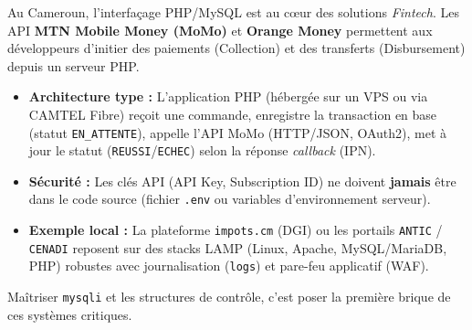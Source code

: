 \documentclass[11pt]{article}
\begin{document}
\begin{savaistu}
Au Cameroun, l'interfaçage PHP/MySQL est au cœur des solutions \emph{Fintech}. Les API \textbf{MTN Mobile Money (MoMo)} et \textbf{Orange Money} permettent aux développeurs d'initier des paiements (Collection) et des transferts (Disbursement) depuis un serveur PHP.
\begin{itemize}
\item \textbf{Architecture type :} L'application PHP (hébergée sur un VPS ou via CAMTEL Fibre) reçoit une commande, enregistre la transaction en base (statut \texttt{EN\_ATTENTE}), appelle l'API MoMo (HTTP/JSON, OAuth2), met à jour le statut (\texttt{REUSSI}/\texttt{ECHEC}) selon la réponse \emph{callback} (IPN).
\item \textbf{Sécurité :} Les clés API (API Key, Subscription ID) ne doivent \textbf{jamais} être dans le code source (fichier \texttt{.env} ou variables d'environnement serveur).
\item \textbf{Exemple local :} La plateforme \texttt{impots.cm} (DGI) ou les portails \texttt{ANTIC} / \texttt{CENADI} reposent sur des stacks LAMP (Linux, Apache, MySQL/MariaDB, PHP) robustes avec journalisation (\texttt{logs}) et pare-feu applicatif (WAF).
\end{itemize}
Maîtriser \texttt{mysqli} et les structures de contrôle, c'est poser la première brique de ces systèmes critiques.
\end{savaistu}
\end{document}
